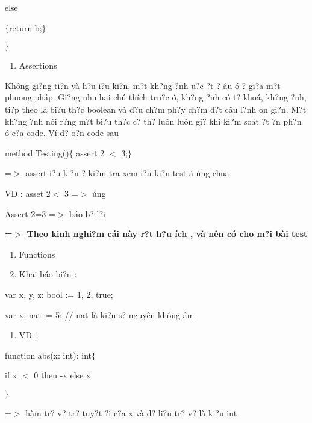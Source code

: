 \documentclass{article} %
\begin{document}
\noindent   else 

\noindent   $\{$return b;$\}$

\noindent $\}$

\noindent 

\begin{enumerate}
\item  Assertions
\end{enumerate}

Kh\^{o}ng gi?ng ti?n v\`{a} h?u {\dj}i?u ki?n, m?t kh?ng {\dj}?nh {\dj}u?c {\dj}?t ? {\dj}\^{a}u {\dj}\'{o} ? gi?a m?t phuong ph\'{a}p. Gi?ng nhu hai ch\'{u} th\'{i}ch tru?c {\dj}\'{o}, kh?ng {\dj}?nh c\'{o} t? kho\'{a}, kh?ng {\dj}?nh, ti?p theo l\`{a} bi?u th?c boolean v\`{a} d?u ch?m ph?y ch?m d?t c\^{a}u l?nh {\dj}on gi?n. M?t kh?ng {\dj}?nh n\'{o}i r?ng m?t bi?u th?c c? th? lu\^{o}n lu\^{o}n gi? khi ki?m so\'{a}t {\dj}?t {\dj}?n ph?n {\dj}\'{o} c?a code. V\'{i} d? {\dj}o?n code sau

\noindent method Testing()$\{$   assert 2 $<$ 3;$\}$

\noindent 

\noindent =$>$ assert {\dj}i?u ki?n {\dj}? ki?m tra xem {\dj}i?u ki?n test {\dj}\~{a} {\dj}\'{u}ng chua

\noindent VD : asset 2$<$ 3 =$>$ {\dj}\'{u}ng

\noindent Assert 2=3 =$>$ b\'{a}o b? l?i

\noindent \textbf{=$\boldsymbol{>}$ Theo kinh nghi?m c\'{a}i n\`{a}y r?t h?u \'{i}ch , v\`{a} n\^{e}n c\'{o} cho m?i b\`{a}i test}

\begin{enumerate}
\item \textbf{ }Functions

\item  Khai b\'{a}o bi?n :
\end{enumerate}

\noindent var x, y, z: bool := 1, 2, true;

\noindent var x: nat := 5;  // nat l\`{a} ki?u s? nguy\^{e}n kh\^{o}ng \^{a}m 

\begin{enumerate}
\item  VD :
\end{enumerate}

\noindent  function abs(x: int): int$\{$

\noindent if x $<$ 0 then -x else x

\noindent $\}$

\noindent =$>$ h\`{a}m tr? v? tr? tuy?t {\dj}?i c?a x v\`{a} d? li?u tr? v? l\`{a} ki?u int
\end{document}
